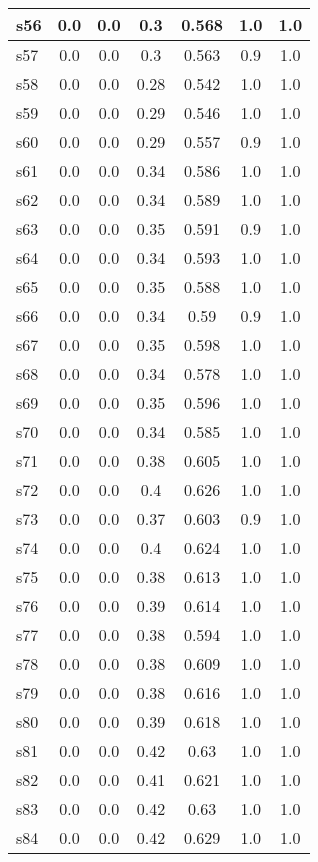\documentclass{article}
\begin{document}
\begin{tabular}{|l|c|c|c|c|c|c|}
\hline
s56 &0.0 & 0.0 & 0.3 & 0.568 & 1.0 & 1.0\\
\hline
s57 &0.0 & 0.0 & 0.3 & 0.563 & 0.9 & 1.0\\
\hline
s58 &0.0 & 0.0 & 0.28 & 0.542 & 1.0 & 1.0\\
\hline
s59 &0.0 & 0.0 & 0.29 & 0.546 & 1.0 & 1.0\\
\hline
s60 &0.0 & 0.0 & 0.29 & 0.557 & 0.9 & 1.0\\
\hline
s61 &0.0 & 0.0 & 0.34 & 0.586 & 1.0 & 1.0\\
\hline
s62 &0.0 & 0.0 & 0.34 & 0.589 & 1.0 & 1.0\\
\hline
s63 &0.0 & 0.0 & 0.35 & 0.591 & 0.9 & 1.0\\
\hline
s64 &0.0 & 0.0 & 0.34 & 0.593 & 1.0 & 1.0\\
\hline
s65 &0.0 & 0.0 & 0.35 & 0.588 & 1.0 & 1.0\\
\hline
s66 &0.0 & 0.0 & 0.34 & 0.59 & 0.9 & 1.0\\
\hline
s67 &0.0 & 0.0 & 0.35 & 0.598 & 1.0 & 1.0\\
\hline
s68 &0.0 & 0.0 & 0.34 & 0.578 & 1.0 & 1.0\\
\hline
s69 &0.0 & 0.0 & 0.35 & 0.596 & 1.0 & 1.0\\
\hline
s70 &0.0 & 0.0 & 0.34 & 0.585 & 1.0 & 1.0\\
\hline
s71 &0.0 & 0.0 & 0.38 & 0.605 & 1.0 & 1.0\\
\hline
s72 &0.0 & 0.0 & 0.4 & 0.626 & 1.0 & 1.0\\
\hline
s73 &0.0 & 0.0 & 0.37 & 0.603 & 0.9 & 1.0\\
\hline
s74 &0.0 & 0.0 & 0.4 & 0.624 & 1.0 & 1.0\\
\hline
s75 &0.0 & 0.0 & 0.38 & 0.613 & 1.0 & 1.0\\
\hline
s76 &0.0 & 0.0 & 0.39 & 0.614 & 1.0 & 1.0\\
\hline
s77 &0.0 & 0.0 & 0.38 & 0.594 & 1.0 & 1.0\\
\hline
s78 &0.0 & 0.0 & 0.38 & 0.609 & 1.0 & 1.0\\
\hline
s79 &0.0 & 0.0 & 0.38 & 0.616 & 1.0 & 1.0\\
\hline
s80 &0.0 & 0.0 & 0.39 & 0.618 & 1.0 & 1.0\\
\hline
s81 &0.0 & 0.0 & 0.42 & 0.63 & 1.0 & 1.0\\
\hline
s82 &0.0 & 0.0 & 0.41 & 0.621 & 1.0 & 1.0\\
\hline
s83 &0.0 & 0.0 & 0.42 & 0.63 & 1.0 & 1.0\\
\hline
s84 &0.0 & 0.0 & 0.42 & 0.629 & 1.0 & 1.0\\

\end{tabular}
\end{document}
